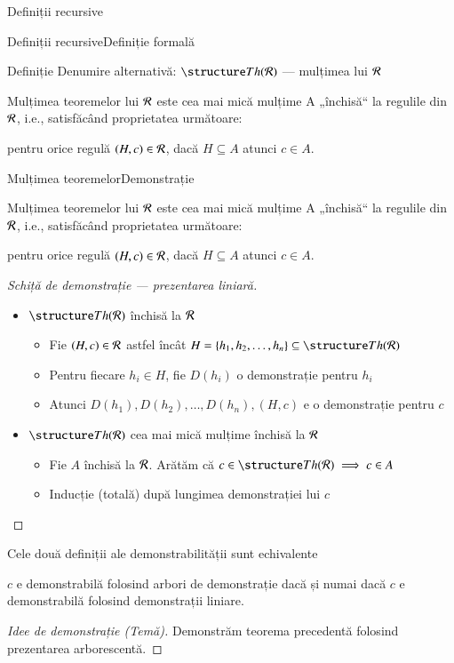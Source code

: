 \documentclass[xcolor=pdftex,romanian,colorlinks]{beamer}
\begin{document}
\begin{section}{Definiții recursive}
\begin{frame}{Definiții recursive}{Definiție formală}
\begin{block}{Definiție}
 Denumire alternativă: $\Th{\R}$ --- mulțimea  lui ${\cal R}$

  \end{block}

\begin{theorem}
Mulțimea teoremelor lui $\cal R$ este cea mai mică mulțime A „închisă“ la regulile din $\cal R$, i.e.,  satisfăcând proprietatea următoare:
      
\hfill pentru orice regulă $(H,c) \in {\cal R}$, dacă $H\subseteq A$ atunci $c\in A$.\hfill\;
\end{theorem}
\end{frame}

\begin{frame}{Mulțimea teoremelor}{Demonstrație}
\begin{theorem}
Mulțimea teoremelor lui $\cal R$ este cea mai mică mulțime A „închisă“ la regulile din $\cal R$, i.e.,  satisfăcând proprietatea următoare:
      
\hfill pentru orice regulă $(H,c) \in {\cal R}$, dacă $H\subseteq A$ atunci $c\in A$.\hfill\;
\end{theorem}
\begin{proof}[Schiță de demonstrație --- prezentarea liniară]
\begin{itemize}
\item $\Th{\R}$ închisă la ${\cal R}$
\begin{itemize}
\item<2-> Fie $(H,c) \in {\cal R}$ astfel încât $H = \{h_1, h_2, \ldots, h_n\} \subseteq  \Th{\R}$
\item<2-> Pentru fiecare $h_i\in H$, fie $D(h_i)$ o demonstrație pentru $h_i$
\item<2-> Atunci $D(h_1), D(h_2),\ldots,D(h_n), (H,c)$ e o demonstrație pentru $c$
\end{itemize}
\item $\Th\R$ cea mai mică mulțime închisă la ${\cal R}$
\begin{itemize}
\item<3> Fie $A$ închisă la ${\cal R}$. Arătăm că $c\in \Th{\R} \implies c\in A$
\item <3>Inducție (totală) după lungimea demonstrației lui $c$
\end{itemize}
\end{itemize}
\end{proof}
\end{frame}


\begin{frame}{Cele două definiții ale demonstrabilității sunt echivalente}
\begin{theorem}
$c$ e demonstrabilă folosind arbori de demonstrație dacă și numai dacă $c$ e demonstrabilă folosind demonstrații liniare. 
\end{theorem}
\begin{proof}[Idee de demonstrație (Temă)]
Demonstrăm teorema precedentă folosind prezentarea arborescentă.
\end{proof}
\end{frame}

\end{section}
\end{document}
